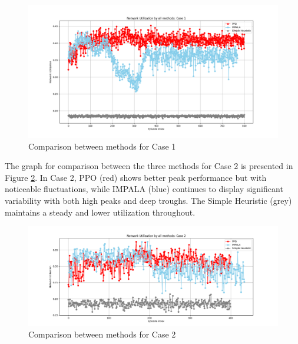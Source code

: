 \documentclass[conference]{IEEEtran}
\begin{document}
\begin{figure}[htp]
    \centering
    \includegraphics[width=\columnwidth]{images/comparison_case1.png}
    \caption{Comparison between methods for Case 1}
    \label{fig:comp_c1}
\end{figure}

The graph for comparison between the three methods for Case 2 is presented in Figure \ref{fig:comp_c2}. In Case 2, PPO (red) shows better peak performance but with noticeable fluctuations, while IMPALA (blue) continues to display significant variability with both high peaks and deep troughs. The Simple Heuristic (grey) maintains a steady and lower utilization throughout.


\begin{figure}[htp]
    \centering
    \includegraphics[width=\columnwidth]{images/comparison_case2.png}
    \caption{Comparison between methods for Case 2}
    \label{fig:comp_c2}
\end{figure}




\end{document}
